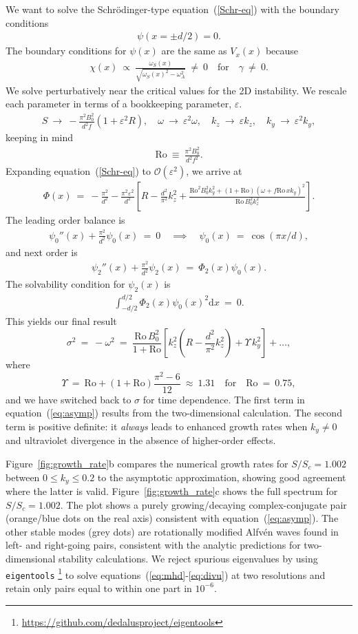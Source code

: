 \documentclass[openacc]{rsproca_new}%
\newcommand{\SSC}{S/S_{c}}
\newcommand\Beq{\begin{eqnarray}}
\newcommand\Eeq{\end{eqnarray}}
\newcommand{\Ro}{\mathrm{Ro}}
\newcommand{\eps}{\varepsilon}
\begin{document}
We want to solve the Schr\"{o}dinger-type equation~(\ref{Schr-eq}) with the boundary conditions 
\Beq
\psi(x=\pm d/2) = 0.
\Eeq
The boundary conditions for $\psi(x)$ are the same as $V_{x}(x)$ because 
\Beq
\chi(x) \ \propto \ \frac{\omega_{S}(x)}{\sqrt{\omega_{S}(x)^2-\omega _A^2}} \  \ne \ 0 \quad \text{for} \quad \gamma \ \ne \ 0.
\Eeq
We solve perturbatively near the critical values for the 2D instability. We rescale each parameter in terms of a bookkeeping parameter, $\eps$.
\Beq
S  \ \to \  - \frac{\pi ^2 B_{0}^2}{d^2 f} ( 1 + \eps^{2} R), \quad \omega \ \to \ \eps^{2} \omega , \quad k_{z} \ \to \ \eps k_{z}, \quad k_{y} \ \to \ \eps^{2} k_{y},
\Eeq 
keeping in mind
\Beq
\Ro  \ \equiv  \ \frac{\pi ^2 B_{0}^2}{d^2 f^{2}}.
\Eeq
Expanding equation~(\ref{Schr-eq}) to $\mathcal{O}(\eps^{2})$, we arrive at
\Beq
\Phi(x) \ = \ -\frac{\pi^{2}}{d^{2}} - \frac{\pi^{2} \eps^{2}}{d^{2}}\left[R - \frac{d^2 }{\pi^2}k_z^2 + \frac{\Ro^2 B_0^2  k_y^2+(1+\Ro) (\omega + f \Ro\, x k_y) ^2}{ \Ro\, B_0^2
   k_z^2} \right].
\Eeq
The leading order balance is
\Beq
\psi_{0}''(x) + \frac{\pi^{2}}{d^{2}}  \psi_{0}(x) \ = \ 0  \quad \implies \quad \psi_{0}(x) \ = \ \cos(\pi x / d),
\Eeq
and next order is
\Beq
\psi_{2}''(x) + \frac{\pi^{2}}{d^{2}}  \psi_{2}(x) \ = \  \Phi_{2}(x)\psi_{0}(x) .
\Eeq
The solvability condition for $\psi_{2}(x)$ is 
\Beq
\int_{-d/2}^{d/2} \Phi_{2}(x)\psi_{0}(x)^{2} \text{d} x \ = \ 0.
\Eeq
This yields our final result
\begin{equation}\label{eq:asymp}
\sigma^{2}\ = \ - \omega^{2} \ = \  \frac{\Ro\,B_{0}^{2}}{1+\Ro}\left[ k_{z}^{2}\left(R-\frac{d^2}{\pi^{2}}k_{z}^{2}\right)+\Upsilon\,k_{y}^{2}\right]+\ldots,
\end{equation}
where
\begin{equation}
\Upsilon \ = \  \Ro + (1+ \Ro) \frac{\pi^{2}-6}{12}  \ \approx \ 1.31\quad\text{for}\quad{\Ro} \ = \ 0.75,
\end{equation}
and we have switched back to $\sigma$ for time dependence.
The first term in equation~(\ref{eq:asymp}) results from the two-dimensional calculation.
The second term is positive definite: it \emph{always} leads to enhanced growth rates when $k_{y}\neq0$ and ultraviolet divergence in the absence of higher-order effects.

Figure~\ref{fig:growth_rate}b compares the numerical growth rates for $\SSC=1.002$ between $0\le{k_{y}}\le0.2$ to the asymptotic approximation, showing good agreement where the latter is valid.
Figure~\ref{fig:growth_rate}c shows the full spectrum for $\SSC=1.002$.
The plot shows a purely growing/decaying complex-conjugate pair (orange/blue dots on the real axis) consistent with equation~(\ref{eq:asymp}).
The other stable modes (grey dots) are rotationally modified Alfv\'{e}n waves found in left- and right-going pairs, consistent with the analytic predictions for two-dimensional stability calculations.
We reject spurious eigenvalues by using \texttt{eigentools} \footnote{\protect\url{https://github.com/dedalusproject/eigentools}} to solve equations~(\ref{eq:mhd}-\ref{eq:divu}) at two resolutions and retain only pairs equal to within one part in $10^{-6}$.
\end{document}
